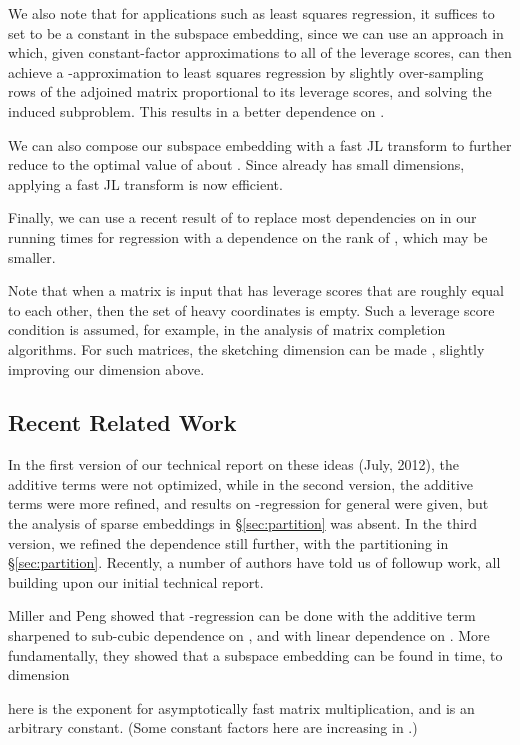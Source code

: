 \documentclass{sig-alternate}
\begin{document}
We also note that for applications such as least squares regression, it suffices to set
 to be a constant in the subspace embedding, since we can use an approach in \cite{dmm06,ddhkm09}
which, given constant-factor 
approximations to all of the
leverage scores, can then achieve a -approximation to least squares regression by slightly 
over-sampling rows of the adjoined matrix  proportional to its leverage scores,
and solving the induced subproblem. This results in a better dependence on . 

We can also compose our subspace embedding with a fast JL transform
to further reduce  to the optimal value of about . Since  already has small
dimensions, applying a fast JL transform is now efficient. 

Finally, we can use a recent result of \cite{ckl12} to replace most dependencies on  in 
our running times for regression with a dependence on the rank  of , which may be smaller. 

Note that when a matrix  is input that has leverage scores that are roughly equal to each other,
then the set  of heavy coordinates is empty. Such a leverage score condition is assumed, for example,
in the analysis of matrix completion algorithms. For such matrices, the sketching dimension can
be made , slightly improving our  dimension above.


\subsection{Recent Related Work}
In the first version of our technical report on these ideas (July, 2012), 
the additive  terms 
were not optimized, while in the second version, the additive terms were more refined,
and results on -regression for general  were given,
but the analysis of sparse embeddings in \S\ref{sec:partition} was absent.
In the third version, we refined the dependence still further, with the
partitioning in \S\ref{sec:partition}.
Recently, a number of authors have told us of
followup work, all building upon our initial technical report. 

Miller and Peng showed that -regression can be done
with the additive term sharpened to sub-cubic dependence
on , and with linear dependence on  \cite{MP}.
More fundamentally, they showed that a subspace embedding
can be found in  time, to
dimension

here  is the exponent for asymptotically fast matrix multiplication,
and  is an arbitrary constant. (Some constant factors here are increasing
in .)
\end{document}
